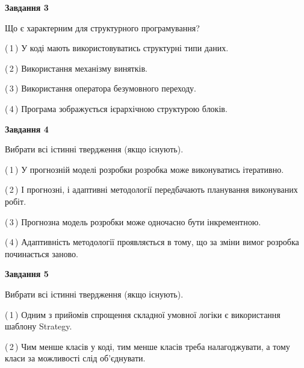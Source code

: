 \documentclass[10pt, ukrainian]{article}
\begin{document}
{\begin {large}
{\begin {center}\textbf{Завдання 3}\end {center}}\par
Що є характерним для структурного програмування?\par
\vspace{2mm}



(\,1\,) У коді мають використовуватись структурні типи даних. %



(\,2\,) Використання механізму винятків. %



(\,3\,) Використання оператора безумовного переходу. %



(\,4\,) Програма зображується ієрархічною структурою блоків.%


{\begin {center}\textbf{Завдання 4}\end {center}}\par
Вибрати всі істинні твердження (якщо існують).\par
\vspace{2mm}



(\,1\,) У прогнозній моделі розробки розробка може виконуватись ітеративно. %



(\,2\,) І прогнозні, і адаптивні методології передбачають планування виконуваних робіт. %



(\,3\,) Прогнозна модель розробки може одночасно бути інкрементною. %



(\,4\,) Адаптивність методології проявляється в тому, що за зміни вимог розробка починається заново. %


{\begin {center}\textbf{Завдання 5}\end {center}}\par
Вибрати всі істинні твердження (якщо існують).\par
\vspace{2mm}



(\,1\,) Одним з прийомів спрощення складної умовної логіки є використання шаблону Strategy. %



(\,2\,) Чим менше класів у коді, тим менше класів треба налагоджувати, а тому класи за можливості слід об'єднувати. %




\end{large}}
\end{document}
